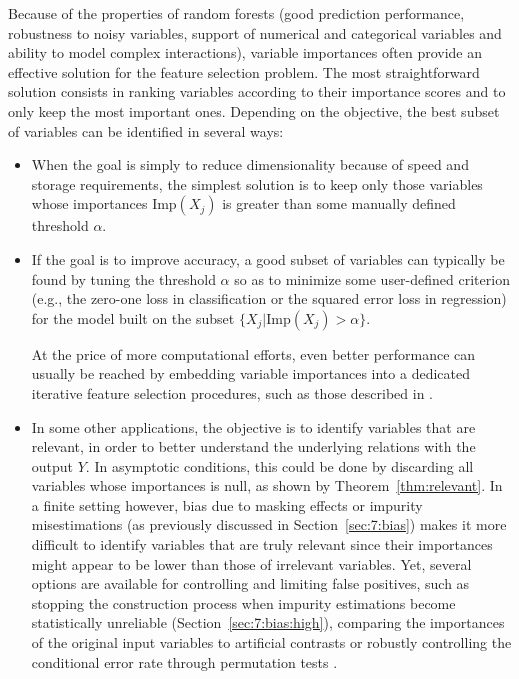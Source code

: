 Because of the properties of random forests (good prediction performance,
robustness to noisy variables, support of numerical and categorical
variables and ability to model complex interactions), variable importances
often provide an effective solution for the feature selection problem. The
most straightforward solution consists in ranking variables according to
their importance scores and to only keep the most important ones. Depending
on the objective, the best subset of variables can be identified in
several ways:

\begin{itemize}
\item  When the goal is simply to reduce dimensionality because of speed
       and storage requirements, the simplest solution
       is to keep only those variables whose importances $\text{Imp}(X_j)$
       is greater than some manually defined threshold $\alpha$.

\item If the goal is to improve accuracy, a good subset
      of variables can typically be found by tuning the threshold $\alpha$ so as to
      minimize some user-defined criterion (e.g., the zero-one loss in classification
      or the squared error loss in regression) for the model built on the
      subset $\{X_j | \text{Imp}(X_j) > \alpha \}$.

      At the price of more computational efforts, even better performance
      can usually be reached by embedding variable importances into a
      dedicated iterative feature selection procedures, such as those
      described in \citep{guyon:2002,tuv:2009}.

\item In some other applications, the objective is to identify variables
      that are relevant, in order to better understand the underlying
      relations with the output $Y$. In asymptotic conditions, this could
      be done by discarding all variables whose importances is null, as shown by Theorem~\ref{thm:relevant}.
      In a finite setting however, bias due to masking effects or impurity misestimations (as previously discussed in Section~\ref{sec:7:bias})
      makes it more difficult to identify variables that are truly
      relevant since their importances might appear to be lower than those of irrelevant variables. Yet, several options
      are available for controlling and limiting false positives,
      such as stopping the construction process when impurity
      estimations become statistically unreliable (Section~\ref{sec:7:bias:high}), comparing the importances
      of the original input variables to artificial contrasts \citep{tuv:2006}
      or robustly controlling the conditional error rate through permutation
      tests \citep{saeys:2012}.
\end{itemize}


